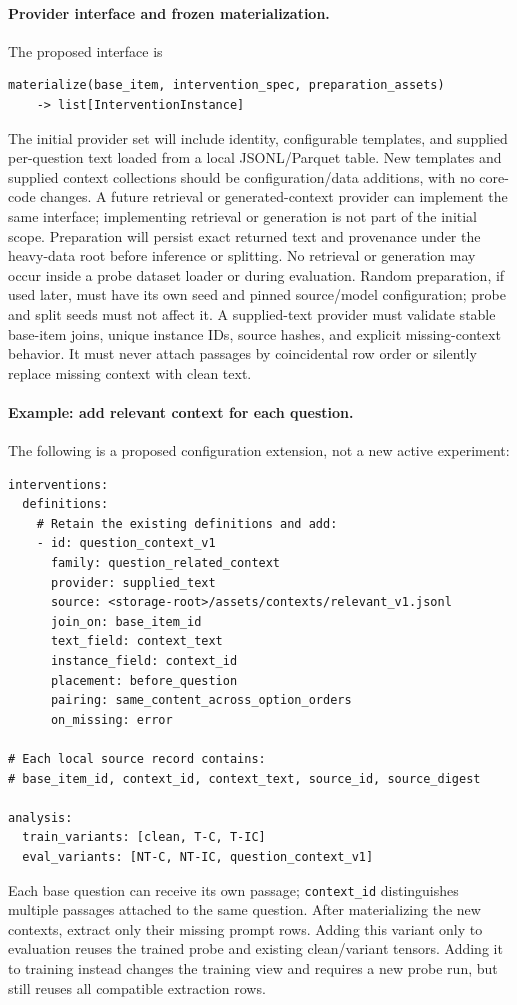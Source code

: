 \documentclass[11pt]{article}
\begin{document}
\paragraph{Provider interface and frozen materialization.}
The proposed interface is
\begin{verbatim}
materialize(base_item, intervention_spec, preparation_assets)
    -> list[InterventionInstance]
\end{verbatim}
The initial provider set will include identity, configurable templates, and supplied per-question text loaded from a local JSONL/Parquet table.
New templates and supplied context collections should be configuration/data additions, with no core-code changes.
A future retrieval or generated-context provider can implement the same interface; implementing retrieval or generation is not part of the initial scope.
Preparation will persist exact returned text and provenance under the heavy-data root before inference or splitting.
No retrieval or generation may occur inside a probe dataset loader or during evaluation.
Random preparation, if used later, must have its own seed and pinned source/model configuration; probe and split seeds must not affect it.
A supplied-text provider must validate stable base-item joins, unique instance IDs, source hashes, and explicit missing-context behavior.
It must never attach passages by coincidental row order or silently replace missing context with clean text.

\paragraph{Example: add relevant context for each question.}
The following is a proposed configuration extension, not a new active experiment:
\begin{verbatim}
interventions:
  definitions:
    # Retain the existing definitions and add:
    - id: question_context_v1
      family: question_related_context
      provider: supplied_text
      source: <storage-root>/assets/contexts/relevant_v1.jsonl
      join_on: base_item_id
      text_field: context_text
      instance_field: context_id
      placement: before_question
      pairing: same_content_across_option_orders
      on_missing: error

# Each local source record contains:
# base_item_id, context_id, context_text, source_id, source_digest

analysis:
  train_variants: [clean, T-C, T-IC]
  eval_variants: [NT-C, NT-IC, question_context_v1]
\end{verbatim}
Each base question can receive its own passage; \texttt{context\_id} distinguishes multiple passages attached to the same question.
After materializing the new contexts, extract only their missing prompt rows.
Adding this variant only to evaluation reuses the trained probe and existing clean/variant tensors.
Adding it to training instead changes the training view and requires a new probe run, but still reuses all compatible extraction rows.
\end{document}
